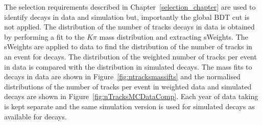 The selection requirements described in Chapter~\ref{selection_chapter} are used to identify \bdkpi decays in data and simulation but, importantly the global BDT cut is not applied. The distribution of the number of tracks \bdkpi decays in data is obtained by performing a fit to the $K\pi$ mass distribution and extracting sWeights. The sWeights are applied to data to find the distribution of the number of tracks in an event for \bdkpi decays. The distribution of the weighted number of tracks per event in data is compared with the distribution in simulated \bdkpi decays. The mass fits to \bdkpi decays in data are shown in Figure~\ref{fig:ntracksmassifts} and the normalised distributions of the number of tracks per event in weighted data and simulated decays are shown in Figure~\ref{fig:nTracksMCDataComp}. Each year of data taking is kept separate and the same simulation version is used for \bdkpi simulated decays as available for \bsmumu decays.




